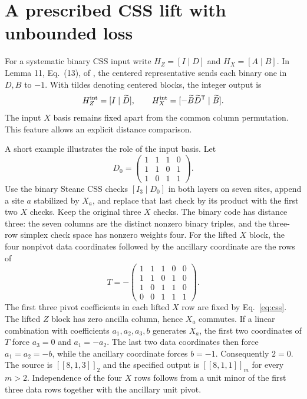 \documentclass[11pt]{article}
\begin{document}
\section{A prescribed CSS lift with unbounded loss}
For a systematic binary CSS input write $H_Z=[I\mid D]$ and $H_X=[A\mid B]$. In Lemma 11, Eq.~(13), of \cite{ldi26}, the centered representative sends each binary one in $D,B$ to $-1$. With tildes denoting centered blocks, the integer output is
\begin{equation}\label{eq:css}
 H_Z^{\rm int}=[I\mid\widetilde D],\qquad
 H_X^{\rm int}=[-\widetilde B\widetilde D^{\mathsf T}\mid\widetilde B].
\end{equation}
The input $X$ basis remains fixed apart from the common column permutation. This feature allows an explicit distance comparison.

A short example illustrates the role of the input basis. Let
\[
 D_0=\begin{pmatrix}1&1&1&0\\1&1&0&1\\1&0&1&1\end{pmatrix}.
\]
Use the binary Steane CSS checks $[I_3\mid D_0]$ in both layers on seven sites, append a site $a$ stabilized by $X_a$, and replace that last check by its product with the first two $X$ checks. Keep the original three $X$ checks. The binary code has distance three: the seven columns are the distinct nonzero binary triples, and the three-row simplex check space has nonzero weights four. For the lifted $X$ block, the four nonpivot data coordinates followed by the ancillary coordinate are the rows of
\[
 T=-\begin{pmatrix}1&1&1&0&0\\1&1&0&1&0\\1&0&1&1&0\\0&0&1&1&1\end{pmatrix}.
\]
The first three pivot coefficients in each lifted $X$ row are fixed by Eq.~\eqref{eq:css}. The lifted $Z$ block has zero ancilla column, hence $X_a$ commutes. If a linear combination with coefficients $a_1,a_2,a_3,b$ generates $X_a$, the first two coordinates of $T$ force $a_3=0$ and $a_1=-a_2$. The last two data coordinates then force $a_1=a_2=-b$, while the ancillary coordinate forces $b=-1$. Consequently $2=0$. The source is $[[8,1,3]]_2$ and the specified output is $[[8,1,1]]_m$ for every $m>2$. Independence of the four $X$ rows follows from a unit minor of the first three data rows together with the ancillary unit pivot. 
\end{document}
